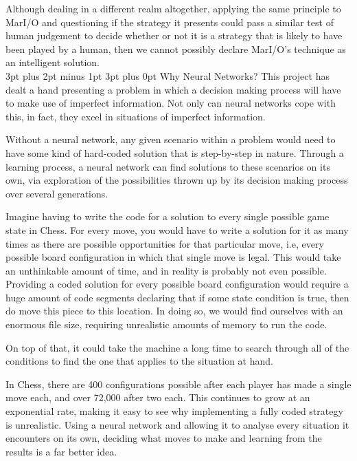 \documentclass[12pt,a4paper]{article}
\makeatletter
\renewcommand\subsection{\@startsection {subsection}{1}{2mm} %
                               {3pt plus 2pt minus 1pt} %
                               {3pt plus 0pt} %
                               {\normalfont\bfseries}}
\makeatother
\begin{document}
Although dealing in a different realm altogether, applying the same principle to MarI/O and questioning if the strategy it presents could pass a similar test of human judgement to decide whether or not it is a strategy that is likely to have been played by a human, then we cannot possibly declare MarI/O's technique as an intelligent solution. \\

\subsection{Why Neural Networks?}
This project has dealt a hand presenting a problem in which a decision making process will have to make use of imperfect information. Not only can neural networks cope with this, in fact, they excel in situations of imperfect information.

Without a neural network, any given scenario within a problem would need to have some kind of hard-coded solution that is step-by-step in nature. Through a learning process, a neural network can find solutions to these scenarios on its own, via exploration of the possibilities thrown up by its decision making process over several generations. 

Imagine having to write the code for a solution to every single possible game state in Chess. For every move, you would have to write a solution for it as many times as there are possible opportunities for that particular move, i.e, every possible board configuration in which that single move is legal. This would take an unthinkable amount of time, and in reality is probably not even possible. Providing a coded solution for every possible board configuration would require a huge amount of code segments declaring that if some state condition is true, then do move this piece to this location. In doing so, we would find ourselves with an enormous file size, requiring unrealistic amounts of memory to run the code. 

On top of that, it could take the machine a long time to search through all of the conditions to find the one that applies to the situation at hand. 

In Chess, there are 400 configurations possible after each player has made a single move each, and over 72,000 after two each\citep{20}. This continues to grow at an exponential rate, making it easy to see why implementing a fully coded strategy is unrealistic. Using a neural network and allowing it to analyse every situation it encounters on its own, deciding what moves to make and learning from the results is a far better idea. 
\end{document}

